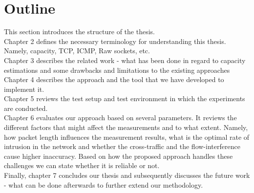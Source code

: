 \section{Outline}
This section introduces the structure of the thesis.
\\Chapter 2 defines the necessary terminology for understanding this thesis. Namely, capacity, TCP, ICMP, Raw sockets, etc. 
\\Chapter 3 describes the related work - what has been done in regard to capacity estimations and some drawbacks and limitations to the existing approaches
\\Chapter 4 describes the approach and the tool that we have developed to implement it. 
\\Chapter 5 reviews the test setup and test environment in which the experiments are conducted.
\\Chapter 6 evaluates our approach based on several parameters. It reviews the different factors that might affect the measurements and to what extent. Namely, how packet length influences the measurement results, what is the optimal rate of intrusion in the network and whether the cross-traffic and the flow-interference cause higher inaccuracy. Based on how the proposed approach handles these challenges we can state whether it is reliable or not.
\\Finally, chapter 7 concludes our thesis and subsequently discusses the future work - what can be done afterwards to further extend our methodology. 